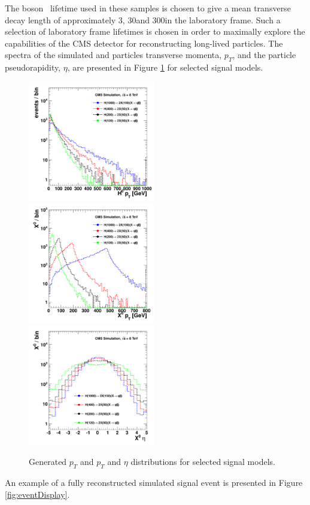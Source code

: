  The
\X boson ~lifetime used in these samples is chosen to give a mean transverse decay length of approximately
3\cm, 30\cm and 300\cm in the laboratory frame. Such a selection of laboratory frame lifetimes is chosen in
order to maximally explore the capabilities of the CMS detector for reconstructing long-lived particles.
The spectra of the simulated \Higgs and \X particles transverse momenta, $p_T$, 
and the \X particle pseudorapidity, $\eta$, are presented in Figure \ref{fig:sigHX} for selected
signal models.
\begin{figure}[htbp]
\centering
\includegraphics[width=0.495\textwidth]{plots/signal/hpt.pdf}
\includegraphics[width=0.495\textwidth]{plots/signal/xpt.pdf}
\includegraphics[width=0.495\textwidth]{plots/signal/xeta.pdf}
\caption{Generated \Higgs $p_T$ and \X $p_T$ and $\eta$ distributions for selected signal models.\label{fig:sigHX}}
\end{figure}
An example of a fully reconstructed
simulated signal event is presented in Figure \ref{fig:eventDisplay}.

